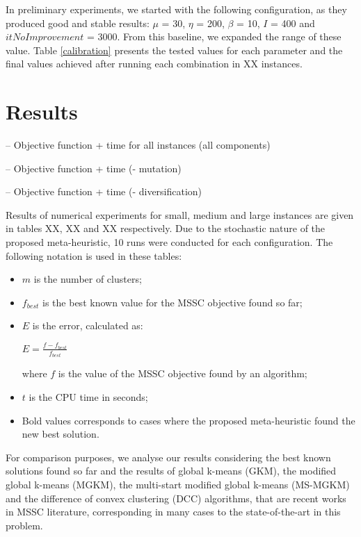 In preliminary experiments, we started with the following configuration, as they produced good and stable results: $\mu$ = 30, $\eta$ = 200, $\beta$ = 10, $I$ = 400 and $itNoImprovement$ = 3000. From this baseline, we expanded the range of these value. Table \ref{calibration} presents the tested values for each parameter and the final values achieved after running each combination in XX instances.



\section{Results}

-- Objective function + time for all instances (all components)

-- Objective function + time (- mutation)

-- Objective function + time (- diversification)

Results of numerical experiments for small, medium and large instances are given in tables XX, XX and XX respectively. Due to the stochastic nature of the proposed meta-heuristic, 10 runs were conducted for each configuration. The following notation is used in these tables:

\begin{itemize}

	\item $m$ is the number of clusters;

	\item $f_{best}$ is the best known value for the MSSC objective found so far;

	\item $E$ is the error, calculated as:

		\begin{center}
		\Large
			$E = \frac{f - f_{best}}{f_{best}}$
		\end{center}
		
	where $f$ is the value of the MSSC objective found by an algorithm;
	
	\item $t$ is the CPU time in seconds;

	\item Bold values corresponds to cases where the proposed meta-heuristic found the new best solution.

\end{itemize}

For comparison purposes, we analyse our results considering the best known solutions found so far and the results of global k-means (GKM), the modified global k-means (MGKM), the multi-start modified global k-means (MS-MGKM) and the difference of convex clustering (DCC) algorithms, that are recent works in MSSC literature, corresponding in many cases to the state-of-the-art in this problem.
